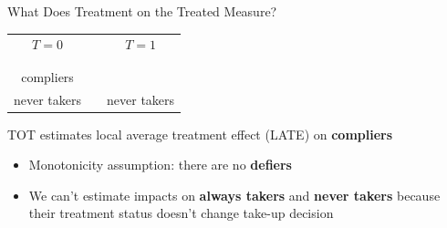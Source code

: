 \documentclass[10pt,xcolor=table,ignorenonframetext,aspectratio=169]{beamer}
\newlength{\wideitemsep}
\let\olditem\item
\renewcommand{\item}{\setlength{\itemsep}{\wideitemsep}\olditem}
\begin{document}

\begin{frame}{What Does Treatment on the Treated Measure?}

\medskip
\begin{center}
	\begin{small}
		\begingroup
		\setlength{\tabcolsep}{10pt} %
		\renewcommand{\arraystretch}{2} %
		\begin{tabular}{ccc}
			$T = 0$	& & $T = 1$ \\ \cline{1-1} \cline{3-3} 
			& & \\ [-5.4ex]
			\cellcolor{greenish!20}{always takers} & & \cellcolor{greenish!20}{always takers} \\ \cline{1-1}
			compliers		&	& \cellcolor{greenish!20}{compliers} \\  \cline{3-3} 
			never takers		&	& never takers  \\ \cline{1-1} \cline{3-3}
		\end{tabular}	
		\endgroup
	\end{small}
\end{center}

\medskip
\medskip
TOT estimates local average treatment effect (LATE) on \textbf{compliers}

\medskip
\begin{itemize}
	
	\item Monotonicity assumption:  there are no \textbf{defiers}
	
	\item We can't estimate impacts on \textbf{always takers} and \textbf{never takers} because their treatment status doesn't change take-up decision
	
\end{itemize}

\end{frame}
\end{document}
